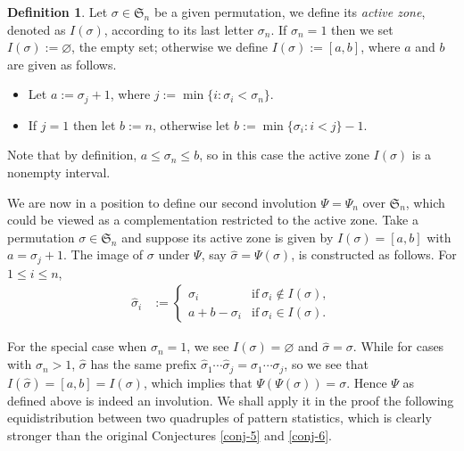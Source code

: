 \documentclass[12pt,reqno]{article}
\numberwithin{equation}{section}
\theoremstyle{plain}
\theoremstyle{definition}
\newtheorem{Def}[theorem]{Definition}
\def\fS{\mathfrak{S}}
\begin{document}
\begin{Def}
Let $\sigma\in\fS_n$ be a given permutation, we define its {\it active zone}, denoted as $I(\sigma)$, according to its last letter $\sigma_n$. If $\sigma_n=1$ then we set $I(\sigma):=\varnothing$, the empty set; otherwise we define $I(\sigma):=[a,b]$, where $a$ and $b$ are given as follows. 
\begin{itemize}
	\item Let $a:=\sigma_j+1$, where $j:=\min\{i:\sigma_i<\sigma_n\}$.
	\item If $j=1$ then let $b:=n$, otherwise let $b:=\min\{\sigma_i:i<j\}-1$.
\end{itemize}
Note that by definition, $a\le\sigma_n\le b$, so in this case the active zone $I(\sigma)$ is a nonempty interval.
\end{Def}

We are now in a position to define our second involution $\Psi=\Psi_n$ over $\fS_n$, which could be viewed as a complementation restricted to the active zone. Take a permutation $\sigma\in\fS_n$ and suppose its active zone is given by $I(\sigma)=[a,b]$ with $a=\sigma_j+1$. The image of $\sigma$ under $\Psi$, say $\hat{\sigma}=\Psi(\sigma)$, is constructed as follows. For $1\le i\le n$,
\begin{align*}
\hat{\sigma}_i &:=
	\begin{cases}
		\sigma_i & \text{if} \ \sigma_i\notin I(\sigma),\\
		a+b-\sigma_i & \text{if} \ \sigma_i\in I(\sigma).
	\end{cases}
\end{align*}

For the special case when $\sigma_n=1$, we see $I(\sigma)=\varnothing$ and $\hat{\sigma}=\sigma$. While for cases with $\sigma_n>1$, $\hat{\sigma}$ has the same prefix $\hat{\sigma}_1\cdots\hat{\sigma}_j=\sigma_1\cdots\sigma_j$, so we see that $I(\hat{\sigma})=[a,b]=I(\sigma)$, which implies that $\Psi(\Psi(\sigma))=\sigma$. Hence $\Psi$ as defined above is indeed an involution. We shall apply it in the proof the following equidistribution between two quadruples of pattern statistics, which is clearly stronger than the original Conjectures \ref{conj-5} and \ref{conj-6}.
\end{document}
